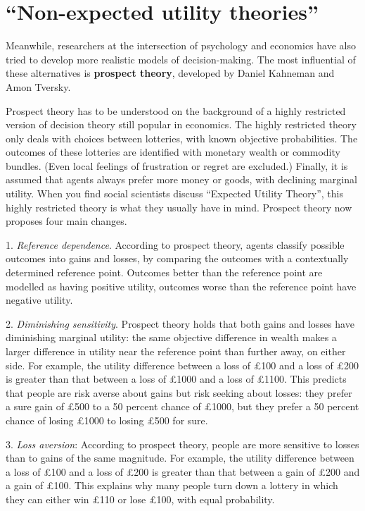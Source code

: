 \section{``Non-expected utility theories''}

Meanwhile, researchers at the intersection of psychology and economics
have also tried to develop more realistic models of
decision-making. The most influential of these alternatives is
\textbf{prospect theory}, developed by Daniel Kahneman and Amon
Tversky.

Prospect theory has to be understood on the background of a highly
restricted version of decision theory still popular in economics. The
highly restricted theory only deals with choices between lotteries,
with known objective probabilities. The outcomes of these lotteries
are identified with monetary wealth or commodity bundles. (Even local
feelings of frustration or regret are excluded.)  Finally, it is
assumed that agents always prefer more money or goods, with declining
marginal utility. When you find social scientists discuss ``Expected
Utility Theory'', this highly restricted theory is what they usually
have in mind. Prospect theory now proposes four main changes.

1. \emph{Reference dependence}. According to prospect theory, agents
classify possible outcomes into gains and losses, by comparing the
outcomes with a contextually determined reference point. Outcomes
better than the reference point are modelled as having positive
utility, outcomes worse than the reference point have negative
utility.

2. \emph{Diminishing sensitivity}. Prospect theory holds that both
gains and losses have diminishing marginal utility: the same objective
difference in wealth makes a larger difference in utility near the
reference point than further away, on either side. For example, the
utility difference between a loss of £100 and a loss of £200 is
greater than that between a loss of £1000 and a loss of £1100. This
predicts that people are risk averse about gains but risk seeking
about losses: they prefer a sure gain of £500 to a 50 percent chance
of £1000, but they prefer a 50 percent chance of losing £1000 to
losing £500 for sure.

3. \emph{Loss aversion}: According to prospect theory, people are
more sensitive to losses than to gains of the same magnitude. For
example, the utility difference between a loss of £100 and a loss of
£200 is greater than that between a gain of £200 and a gain of
£100. This explains why many people turn down a lottery in which they
can either win £110 or lose £100, with equal probability.


